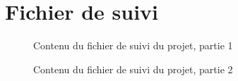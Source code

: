 \section{Fichier de suivi}
\begin{figure}[H]
    \label{fig-suivi-projet1}
    \noindent{}
    \caption{Contenu du fichier de suivi du projet, partie 1}
\end{figure}
\begin{figure}[H]
    \label{fig-suivi-projet2}
    \noindent{}
    \caption{Contenu du fichier de suivi du projet, partie 2}
\end{figure}
%

\appendix
{}


